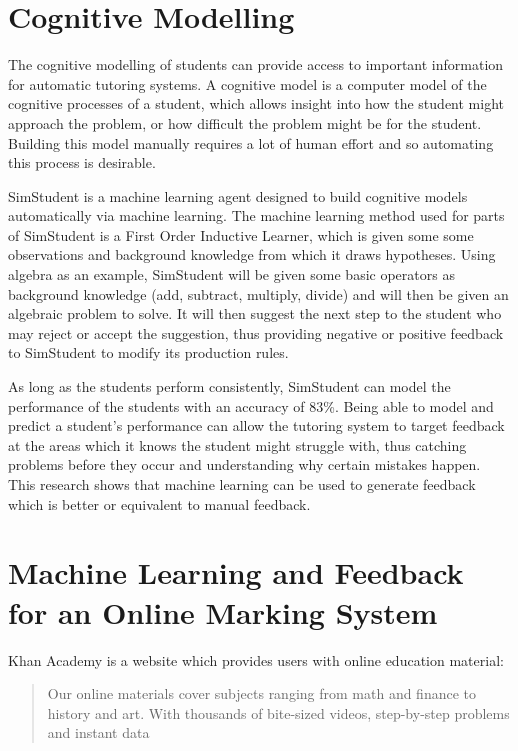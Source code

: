 \section{Cognitive Modelling}
The cognitive modelling of students can provide access to important information for automatic tutoring systems. A cognitive model is a computer model of the cognitive processes of a student, which allows insight into how the student might approach the problem, or how difficult the problem might be for the student. Building this model manually requires a lot of human effort\cite{simstudent_better} and so automating this process is desirable.

SimStudent is a machine learning agent designed to build cognitive models automatically via machine learning. The machine learning method used for parts of SimStudent is a First Order Inductive Learner, which is given some some observations and background knowledge from which it draws hypotheses. Using algebra as an example, SimStudent will be given some basic operators as background knowledge (add, subtract, multiply, divide) and will then be given an algebraic problem to solve. It will then suggest the next step to the student who may reject or accept the suggestion, thus providing negative or positive feedback to SimStudent to modify its production rules.

As long as the students perform consistently, SimStudent can model the performance of the students with an accuracy of 83\%\cite{simstudent}. Being able to model and predict a student's performance can allow the tutoring system to target feedback at the areas which it knows the student might struggle with, thus catching problems before they occur and understanding why certain mistakes happen. This research shows that machine learning can be used to generate feedback which is better or equivalent to manual feedback.

\section{Machine Learning and Feedback for an Online Marking System}
Khan Academy\cite{khan_site} is a website which provides users with online education material:
\begin{quote}
Our online materials cover subjects ranging from math and finance to history and art.  With thousands of bite-sized videos, step-by-step problems and instant data\cite{ka_faq}
\end{quote}

